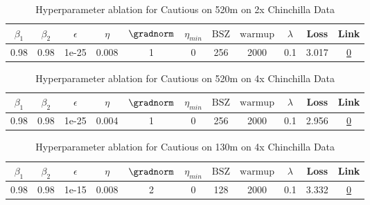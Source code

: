 \begin{table}[H]
\centering
\caption{Hyperparameter ablation for Cautious on 520m on 2x Chinchilla Data}
\label{tab:ablation_cautious_520m_2}
\begin{tabular}{ccccccccccc}
\toprule
$\beta_1$ & $\beta_2$ & $\epsilon$ & $\eta$ & $\gradnorm$ & $\eta_{min}$ & $\mathrm{BSZ}$ & $\mathrm{warmup}$ & $\lambda$ & Loss & Link \\
\midrule
0.98 & 0.98 & 1e-25 & 0.008 & 1 & 0 & 256 & 2000 & 0.1 & 3.017 & \href{https://wandb.ai/stanford-mercury/optimizer-scaling/runs/sweep-520m-21B-cautiousc38916lr0.008-wd0.1-minlr0-warmup2000-b10-e8000b}{0} \\
\midrule
\bottomrule
\end{tabular}
\end{table}

\begin{table}[H]
\centering
\caption{Hyperparameter ablation for Cautious on 520m on 4x Chinchilla Data}
\label{tab:ablation_cautious_520m_4}
\begin{tabular}{ccccccccccc}
\toprule
$\beta_1$ & $\beta_2$ & $\epsilon$ & $\eta$ & $\gradnorm$ & $\eta_{min}$ & $\mathrm{BSZ}$ & $\mathrm{warmup}$ & $\lambda$ & Loss & Link \\
\midrule
0.98 & 0.98 & 1e-25 & 0.004 & 1 & 0 & 256 & 2000 & 0.1 & 2.956 & \href{https://wandb.ai/stanford-mercury/optimizer-scaling/runs/sweep-520m-42B-cautious553798lr0.004-wd0.1-minlr0-warmup2000-b10-e08bbe}{0} \\
\midrule
\bottomrule
\end{tabular}
\end{table}

\begin{table}[H]
\centering
\caption{Hyperparameter ablation for Cautious on 130m on 4x Chinchilla Data}
\label{tab:ablation_cautious_130m_4}
\begin{tabular}{ccccccccccc}
\toprule
$\beta_1$ & $\beta_2$ & $\epsilon$ & $\eta$ & $\gradnorm$ & $\eta_{min}$ & $\mathrm{BSZ}$ & $\mathrm{warmup}$ & $\lambda$ & Loss & Link \\
\midrule
0.98 & 0.98 & 1e-15 & 0.008 & 2 & 0 & 128 & 2000 & 0.1 & 3.332 & \href{https://wandb.ai/stanford-mercury/optimizer-scaling/runs/sweep-130m-10B-cautious3e1de9lr0.008-wd0.1-minlr0-warmup2000-b10-3b5403}{0} \\
\midrule
\bottomrule
\end{tabular}
\end{table}

